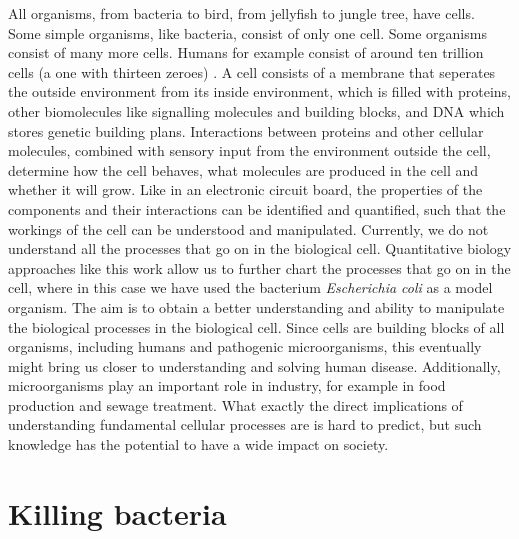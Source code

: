 All organisms, from bacteria to bird, from jellyfish to jungle tree, have cells. 
%
Some simple organisms, like bacteria, consist of only one cell.
Some organisms consist of many more cells.
Humans for example consist of around ten trillion cells (a one with thirteen zeroes) \cite[BNID 102390]{Milo2010}.
%
A cell consists of a membrane that %
seperates the outside environment from its inside environment, 
which is filled with proteins, other biomolecules like signalling molecules and building blocks, and DNA which stores genetic building plans.
%
Interactions between proteins and other cellular molecules, combined with sensory input from the environment outside the cell, 
determine how the cell behaves, what molecules are produced in the cell and whether it will grow.
%
Like 
in an electronic circuit board,
the properties of the components and their interactions can be identified and quantified,
such that the workings of the cell can be understood and manipulated.
%
Currently, we do not understand all the processes that go on in the biological cell.
%
Quantitative biology approaches like this work allow us to further chart the processes that go on in the cell,
where in this case we have used the bacterium \textit{Escherichia coli} as a model organism. 
%
The aim is to obtain a better understanding and ability to manipulate the biological processes in the biological cell. 
%
Since cells are building blocks of all organisms, 
including humans and pathogenic microorganisms,
this eventually might bring us closer to understanding and solving human disease.
%
Additionally, microorganisms play an important role in industry,
for example in food production and sewage treatment.
%
What exactly the direct implications of understanding fundamental cellular processes are is hard to predict,
but such knowledge has the potential to have a wide impact on society.

\section{Killing bacteria}

